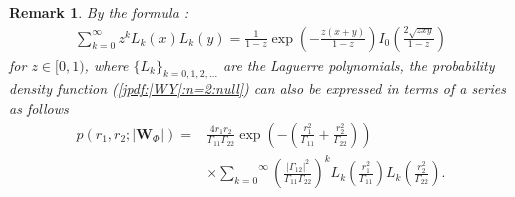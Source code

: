 \documentclass{amsart}
\newtheorem{Remark}{Remark}
\begin{document}
\begin{Remark}
By the formula \cite[eq. 8.976]{gradshteyn2014table}:
\begin{align*}
\sum_{k=0}^{\infty} z^k L_k(x) L_k(y)
=
\frac{1}{1 - z}
\exp\left( -\frac{z(x + y)}{1 - z} \right)
I_{0}\left( \frac{2\sqrt{zxy}}{1 - z} \right)
\end{align*}
for $z\in[0,1)$,
where $\{L_{k}\}_{k=0,1,2,...}$ are the Laguerre polynomials,
the probability density function (\ref{jpdf:|WY|:n=2:null})
can also be expressed in terms of a series as follows
\begin{align*}
p\left(r_{1},r_{2};|\mathbf{W}_{\Phi}|\right)  =&\frac{4r_{1}r_{2}}{\Gamma_{11}\Gamma_{22}}\exp\left(-\left(\frac{r_{1}^2}{\Gamma_{11}}
+\frac{r_{2}^2}{\Gamma_{22}}\right)\right)
\\&\times\overset{\infty}{\underset{k=0}{\sum}}\left(\frac{|\Gamma_{12}|^2}{\Gamma_{11}\Gamma_{22}}\right)^{k}
L_{k}\left(\frac{r_{1}^2}{\Gamma_{11}}\right)
L_{k}\left(\frac{r_{2}^2}{\Gamma_{22}}\right).
\end{align*}
\end{Remark}




\end{document}
